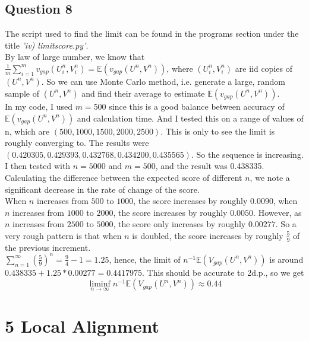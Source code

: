 \documentclass[10pt]{article}
\begin{document}
\subsection*{Question 8}
The script used to find the limit can be found in the programs section under the title \emph{'iv) limit\textunderscore score.py'}. \\
By law of large number, we know that $\frac{1}{m}\sum_{i=1}^m v_{gap}(U^n_i,V^n_i)=\mathds{E}(v_{gap}(U^n,V^n))$, where $(U^n_i,V^n_i)$ are iid copies of $(U^n,V^n)$. So we can use Monte Carlo method, i.e. generate a large, random sample of $(U^n,V^n)$ and find their average to estimate $\mathds{E}(v_{gap}(U^n,V^n))$.\\
In my code, I used $m=500$ since this is a good balance between accuracy of $\mathds{E}(v_{gap}(U^n,V^n))$ and calculation time. And I tested this on a range of values of n, which are $(500, 1000, 1500, 2000, 2500)$. This is only to see the limit is roughly converging to. The results were $(0.420305,0.429393,0.432768,0.434200,0.435565)$. So the sequence is increasing.\\
I then tested with $n=5000$ and $m=500$, and the result was 0.438335. Calculating the difference between the expected score of different $n$, we note a significant decrease in the rate of change of the score.\\
When $n$ increases from $500$ to $1000$, the score increases by roughly $0.0090$, when $n$ increases from $1000$ to $2000$, the score increases by roughly $0.0050$. However, as $n$ increases from $2500$ to $5000$, the score only increases by roughly $0.00277$. So a very rough pattern is that when $n$ is doubled, the score increases by roughly $\frac{5}{9}$ of the previous increment.\\
$\sum_{n=1}^{\infty}(\frac{5}{9})^n=\frac{9}{4}-1=1.25$, hence, the limit of $n^{-1}\mathds{E}(V_{gap}(U^n,V^n))$ is around $0.438335+1.25*0.00277=0.4417975$. This should be accurate to 2d.p., so we get
\[\liminf_{n\to\infty} n^{-1}\mathds{E}(V_{gap}(U^n,V^n))\approx0.44\]

\section*{5 Local Alignment}
\end{document}
